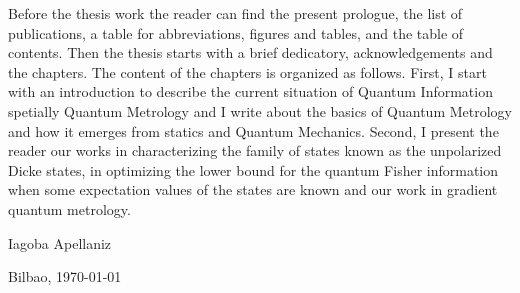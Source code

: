 Before the thesis work the reader can find the present prologue, the list of publications, a table for abbreviations, figures and tables, and the table of contents.
Then the thesis starts with a brief dedicatory, acknowledgements and the chapters.
The content of the chapters is organized as follows.
First, I start with an introduction to describe the current situation of Quantum Information spetially Quantum Metrology and I write about the basics of Quantum Metrology and how it emerges from statics and Quantum Mechanics.
Second, I present the reader our works in characterizing the family of states known as the unpolarized Dicke states, in optimizing the lower bound for the quantum Fisher information when some expectation values of the states are known and our work in gradient quantum metrology.

\begin{flushright}
  Iagoba Apellaniz

  Bilbao, \today
\end{flushright}
